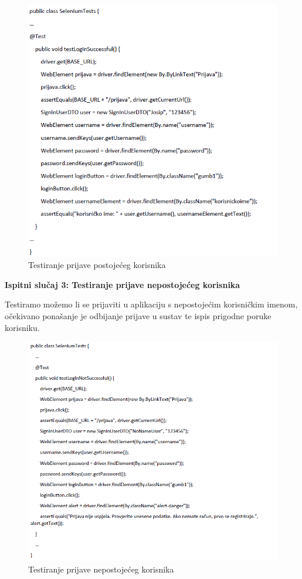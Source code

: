 			
			\begin{figure}[H]
				\includegraphics[scale=0.9]{slike/sel2.PNG} %
				\centering
				\caption{Testiranje prijave postojećeg korisnika}
				\label{fig:sel2}
			\end{figure}
			
			\textbf{Ispitni slučaj 3: Testiranje prijave nepostojećeg korisnika
				}
			
			Testiramo možemo li se prijaviti u aplikaciju s nepostojećim korisničkim imenom, očekivano ponašanje je odbijanje prijave u sustav te ispis prigodne poruke korisniku.
			
			\begin{figure}[H]
				\includegraphics[scale=0.9]{slike/sel3.PNG} %
				\centering
				\caption{Testiranje prijave nepostojećeg korisnika}
				\label{fig:sel3}
			\end{figure}
			
